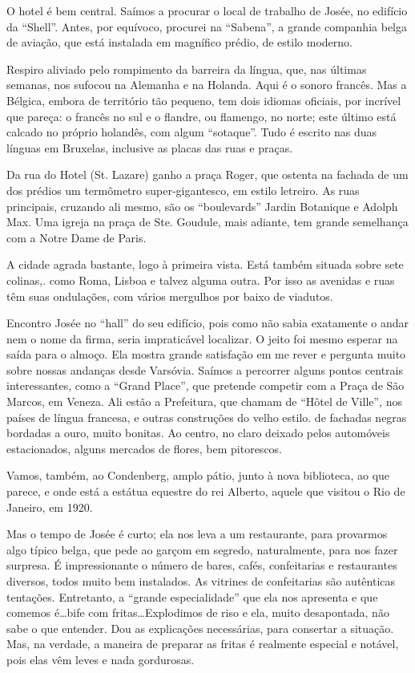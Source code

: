 O hotel é bem central. Saímos a procurar o local de trabalho de Josée, no edifício da “Shell”. Antes, por equívoco, procurei na “Sabena”, a grande companhia belga de aviação, que está instalada em magnífico prédio, de estilo moderno.

Respiro aliviado pelo rompimento da barreira da língua, que, nas últimas semanas, nos sufocou na Alemanha e na Holanda. Aqui é o sonoro francês. Mas a Bélgica, embora de território tão pequeno, tem dois idiomas oficiais, por incrível que pareça: o francês no sul e o flandre, ou flamengo, no norte; este último está calcado no próprio holandês, com algum “sotaque”. Tudo é escrito nas duas línguas em Bruxelas, inclusive as placas das ruas e praças.

Da rua do Hotel (St. Lazare) ganho a praça Roger, que ostenta na fachada de um dos prédios um termômetro super-gigantesco, em estilo letreiro. As ruas principais, cruzando ali mesmo, são os “boulevards” Jardin Botanique e Adolph Max. Uma igreja na praça de Ste. Goudule, mais adiante, tem grande semelhança com a Notre Dame de Paris.

A cidade agrada bastante, logo à primeira vista. Está também situada sobre sete colinas,. como Roma, Lisboa e talvez alguma outra. Por isso as avenidas e ruas têm suas ondulações, com vários mergulhos por baixo de viadutos.

Encontro Josée no “hall” do seu edifício, pois como não sabia exatamente o andar nem o nome da firma, seria impraticável localizar. O jeito foi mesmo esperar na saída para o almoço. Ela mostra grande satisfação em me rever e pergunta muito sobre nossas andanças desde Varsóvia. Saímos a percorrer alguns pontos centrais interessantes, como a “Grand Place”, que pretende competir com a Praça de São Marcos, em Veneza. Ali estão a Prefeitura, que chamam de “Hôtel de Ville”, nos países de língua francesa, e outras construções do velho estilo. de fachadas negras bordadas a ouro, muito bonitas. Ao centro, no claro deixado pelos automóveis estacionados, alguns mercados de flores, bem pitorescos.

Vamos, também, ao Condenberg, amplo pátio, junto à nova biblioteca, ao que parece, e onde está a estátua equestre do rei Alberto, aquele que visitou o Rio de Janeiro, em 1920.

Mas o tempo de Josée é curto; ela nos leva a um restaurante, para provarmos algo típico belga, que pede ao garçom em segredo, naturalmente, para nos fazer surpresa. É impressionante o número de bares, cafés, confeitarias e restaurantes diversos, todos muito bem instalados. As vitrines de confeitarias são autênticas tentações. Entretanto, a “grande especialidade” que ela nos apresenta e que comemos é\ldots bife com fritas\ldots Explodimos de riso e ela, muito desapontada, não sabe o que entender. Dou as explicações necessárias, para consertar a situação. Mas, na verdade, a maneira de preparar as fritas é realmente especial e notável, pois elas vêm leves e nada gordurosas.

